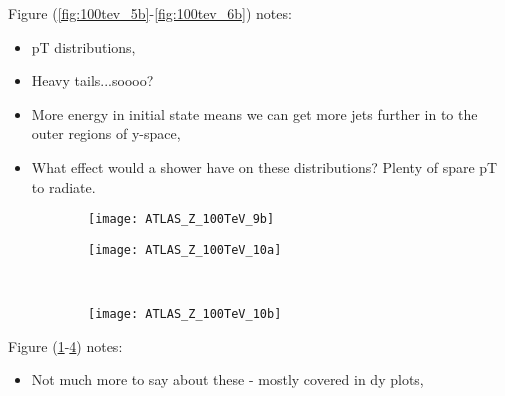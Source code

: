 	Figure (\ref{fig:100tev_5b}-\ref{fig:100tev_6b}) notes:

	\begin{itemize}
		\item pT distributions,
		\item Heavy tails...soooo?
		\item More energy in initial state means we can get more jets further in to the outer regions of y-space,
		\item What effect would a shower have on these distributions?  Plenty of spare pT to radiate.
	\end{itemize}

	\begin{figure}[h]
		\centering
		\begin{subfigure}[b]{0.48\textwidth}
			\texttt{[image: ATLAS\_Z\_100TeV\_9b]}
			\caption{}
			\label{fig:100tev_9b}
		\end{subfigure}

		\begin{subfigure}[b]{0.48\textwidth}
			\texttt{[image: ATLAS\_Z\_100TeV\_10a]}
			\caption{}
			\label{fig:100tev_10a}
		\end{subfigure}
		~
		\begin{subfigure}[b]{0.48\textwidth}
			\texttt{[image: ATLAS\_Z\_100TeV\_10b]}
			\caption{}
			\label{fig:100tev_10b}
		\end{subfigure}
		\caption{}
	\end{figure}

	Figure (\ref{fig:100tev_9b}-\ref{fig:100tev_10b}) notes:

	\begin{itemize}
		\item Not much more to say about these - mostly covered in dy plots,
	\end{itemize}

